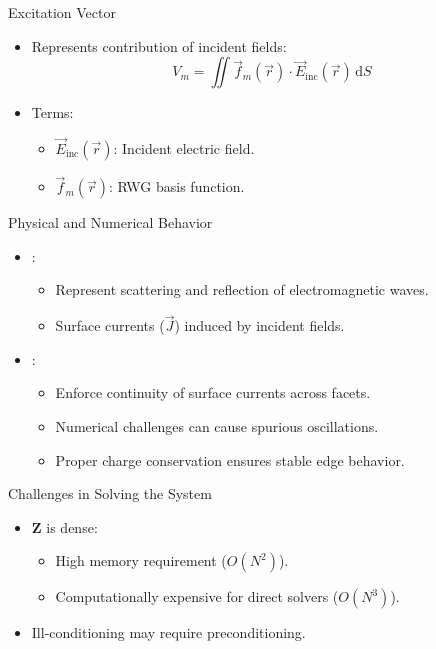\begin{frame}{Excitation Vector}
    \begin{itemize}
        \item Represents contribution of incident fields:
            \begin{equation}
            V_m = \iint \vec{f}_m(\vec{r}) \cdot \vec{E}_\text{inc}(\vec{r}) \, \text{d}S \tag{3}
            \end{equation}
        \item Terms:
            \begin{itemize}
                \item \(\vec{E}_\text{inc}(\vec{r})\): Incident electric field.
                \item \(\vec{f}_m(\vec{r})\): RWG basis function.
            \end{itemize}
    \end{itemize}
\end{frame}

\begin{frame}{Physical and Numerical Behavior}
    \begin{itemize}
        \item {}:
            \begin{itemize}
                \item Represent scattering and reflection of electromagnetic waves.
                \item Surface currents (\(\vec{J}\)) induced by incident fields.
            \end{itemize}
        \item {}:
            \begin{itemize}
                \item Enforce continuity of surface currents across facets.
                \item Numerical challenges can cause spurious oscillations.
                \item Proper charge conservation ensures stable edge behavior.
            \end{itemize}
    \end{itemize}
\end{frame}

\begin{frame}{Challenges in Solving the System}
    \begin{itemize}
        \item \(\mathbf{Z}\) is dense:
            \begin{itemize}
                \item High memory requirement (\(O(N^2)\)).
                \item Computationally expensive for direct solvers (\(O(N^3)\)).
            \end{itemize}
        \item Ill-conditioning may require preconditioning.
    \end{itemize}
\end{frame}

